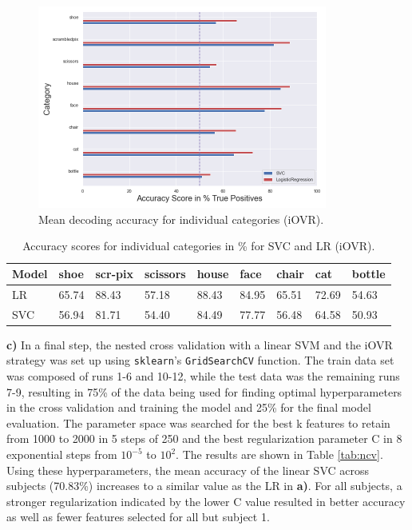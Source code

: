 \documentclass[11pt, a4paper]{article}
\begin{document}
\begin{figure}[hbt!]
\centering
\includegraphics[width=0.85\textwidth]{ind_classes.png}
\caption{Mean decoding accuracy for individual categories (iOVR).}
\label{fig:ind_cl}
\end{figure}
\begin{table}[hbt!]
\centering
\caption{Accuracy scores for individual categories in \% for SVC and LR (iOVR).}
\begin{tabular}{||l||l|l|l|l|l|l|l|l||}
\cline{1-9}
Model  & \multicolumn{1}{l|}{shoe} & \multicolumn{1}{l|}{scr-pix} & \multicolumn{1}{l|}{scissors} & \multicolumn{1}{l|}{house} & \multicolumn{1}{l|}{face} & \multicolumn{1}{l|}{chair} & \multicolumn{1}{l|}{cat} & bottle \\ \hline \hline
LR & 65.74                     & 88.43                        & 57.18                         & 88.43                      & 84.95                     & 65.51                      & 72.69                    & 54.63  \\ %
SVC    & 56.94                     & 81.71                        & 54.40                         & 84.49                      & 77.77                     & 56.48                      & 64.58                    & 50.93  \\ \cline{1-9}
\end{tabular}
\label{tab:cat_score}
\end{table}
\textbf{c)} In a final step, the nested cross validation with a linear SVM and the iOVR strategy was set up using \verb|sklearn|'s \verb|GridSearchCV| function. The train data set was composed of runs 1-6 and 10-12, while the test data was the remaining runs 7-9, resulting in 75\% of the data being used for finding optimal hyperparameters in the cross validation and training the model and 25\% for the final model evaluation. The parameter space was searched for the best k features to retain from 1000 to 2000 in 5 steps of 250 and the best regularization parameter C in 8 exponential steps from $10^{-5}$ to $10^2$. The results are shown in Table \ref{tab:ncv}. Using these hyperparameters, the mean accuracy of the linear SVC across subjects (70.83\%) increases to a similar value as the LR in \textbf{a)}. For all subjects, a stronger regularization indicated by the lower C value resulted in better accuracy as well as fewer features selected for all but subject 1. 
\end{document}
